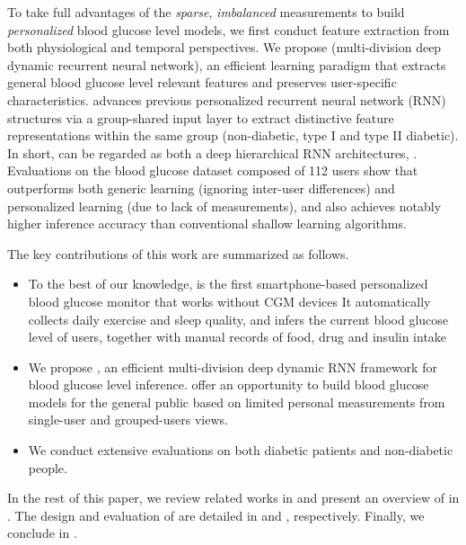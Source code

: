 To take full advantages of the \textit{sparse}, \textit{imbalanced} measurements to build \textit{personalized} blood glucose level models, we first conduct feature extraction from both physiological and temporal perspectives.
We propose \modelname (multi-division deep dynamic recurrent neural network), an efficient learning paradigm that extracts general blood glucose level relevant features and preserves user-specific characteristics.
\modelname advances previous personalized recurrent neural network (RNN) structures via a group-shared input layer to extract distinctive feature representations within the same group (\ie non-diabetic, type I and type II diabetic).
In short, \modelname can be regarded as both a deep hierarchical RNN architectures, .
Evaluations on the blood glucose dataset composed of 112 users  show that \modelname outperforms both generic learning (\ie ignoring inter-user differences) and personalized learning (due to lack of measurements), and also achieves notably higher inference accuracy than conventional shallow learning algorithms.

The key contributions of this work are summarized as follows.
\begin{itemize}
  \item
  To the best of our knowledge, \sysname is the first smartphone-based personalized blood glucose monitor that works without CGM devices 
  It automatically collects daily exercise and sleep quality, and infers the current blood glucose level of users, together with manual records of food, drug and insulin intake 
  \item
  We propose \modelname, an efficient multi-division deep dynamic RNN framework for blood glucose level inference.
   offer an opportunity to build blood glucose models for the general public based on limited personal measurements from single-user and grouped-users views.
  \item
  We conduct extensive evaluations on both diabetic patients and non-diabetic people.
\end{itemize}

In the rest of this paper, we review related works in  and present an overview of \sysname in .
The design and evaluation of \sysname are detailed in  and , respectively.
Finally, we conclude in .

